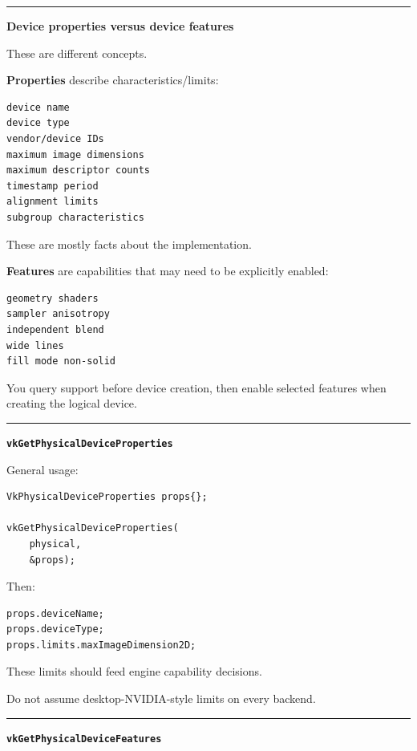 \begin{center}\rule{0.5\linewidth}{0.5pt}\end{center}

\textbf{Device properties versus device features}

These are different concepts.

\textbf{Properties} describe characteristics/limits:

\begin{verbatim}
device name
device type
vendor/device IDs
maximum image dimensions
maximum descriptor counts
timestamp period
alignment limits
subgroup characteristics
\end{verbatim}

These are mostly facts about the implementation.

\textbf{Features} are capabilities that may need to be explicitly enabled:

\begin{verbatim}
geometry shaders
sampler anisotropy
independent blend
wide lines
fill mode non-solid
\end{verbatim}

You query support before device creation, then enable selected features when creating the logical device.

\begin{center}\rule{0.5\linewidth}{0.5pt}\end{center}

\textbf{\texttt{vkGetPhysicalDeviceProperties}}

General usage:

\begin{verbatim}
VkPhysicalDeviceProperties props{};

vkGetPhysicalDeviceProperties(
    physical,
    &props);
\end{verbatim}

Then:

\begin{verbatim}
props.deviceName;
props.deviceType;
props.limits.maxImageDimension2D;
\end{verbatim}

These limits should feed engine capability decisions.

Do not assume desktop-NVIDIA-style limits on every backend.

\begin{center}\rule{0.5\linewidth}{0.5pt}\end{center}

\textbf{\texttt{vkGetPhysicalDeviceFeatures}}

